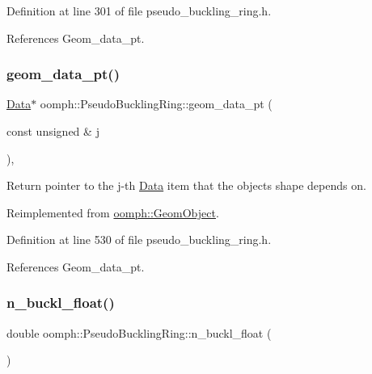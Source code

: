 Definition at line 301 of file pseudo\+\_\+buckling\+\_\+ring.\+h.



References Geom\+\_\+data\+\_\+pt.

\mbox{\label{classoomph_1_1PseudoBucklingRing_a5f53b50c00bf2cf98db90a09dc65b410}} 
\subsubsection{\texorpdfstring{geom\+\_\+data\+\_\+pt()}{geom\_data\_pt()}}
{\footnotesize\ttfamily \hyperlink{classoomph_1_1Data}{Data}$\ast$ oomph\+::\+Pseudo\+Buckling\+Ring\+::geom\+\_\+data\+\_\+pt (\begin{DoxyParamCaption}\item[{const unsigned \&}]{j }\end{DoxyParamCaption})\hspace{0.3cm}{\ttfamily [inline]}, {\ttfamily [virtual]}}



Return pointer to the j-\/th \hyperlink{classoomph_1_1Data}{Data} item that the object\textquotesingle{}s shape depends on. 



Reimplemented from \hyperlink{classoomph_1_1GeomObject_ae1940fc6a3050e645c3882f2f6f3a202}{oomph\+::\+Geom\+Object}.



Definition at line 530 of file pseudo\+\_\+buckling\+\_\+ring.\+h.



References Geom\+\_\+data\+\_\+pt.

\mbox{\label{classoomph_1_1PseudoBucklingRing_a61e55df2895b2a1cd877517a31e928e4}} 
\subsubsection{\texorpdfstring{n\+\_\+buckl\+\_\+float()}{n\_buckl\_float()}}
{\footnotesize\ttfamily double oomph\+::\+Pseudo\+Buckling\+Ring\+::n\+\_\+buckl\+\_\+float (\begin{DoxyParamCaption}{ }\end{DoxyParamCaption})\hspace{0.3cm}{\ttfamily [inline]}}



